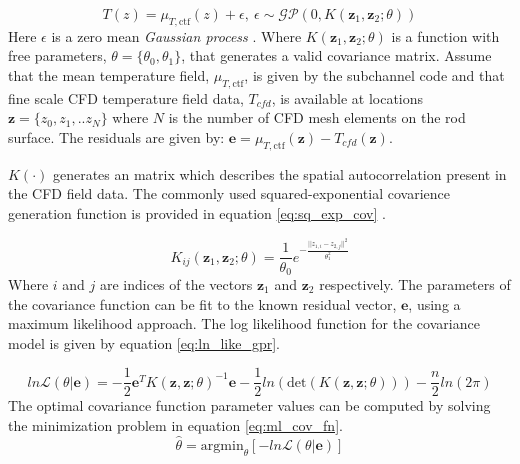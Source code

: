 \begin{equation}
T(z) = \mu_{T, \mathrm{ctf}}(z) + \epsilon,\ \epsilon \sim \mathcal {GP}(0, K(\mathbf z_1, \mathbf z_2;\theta))
\label{eq:simple_krig_ab}
\end{equation}
Here $\epsilon$ is a zero mean \emph{Gaussian process}  \cite{rasmussen2004gaussian}.
Where $K(\mathbf z_1, \mathbf z_2;\theta)$ is a function  with free parameters, $\theta=\{\theta_0,\theta_1\}$, that generates a valid covariance matrix.  Assume that the mean temperature field, $\mu_{T, \mathrm{ctf}}$, is given by the subchannel code and that fine scale CFD temperature field data, $T_{cfd}$, is available at locations $\mathbf z = \{z_0, z_1, .. z_N\}$ where $N$ is the number of CFD mesh elements on the rod surface.  The residuals are given by: $\mathbf e = \mu_{T, \mathrm{ctf}}(\mathbf z) - T_{cfd}(\mathbf z)$.  

$K(\cdot)$ generates an matrix which describes the spatial autocorrelation present in the CFD field data.  The commonly used squared-exponential covarience generation function is provided in equation \ref{eq:sq_exp_cov} \cite{rasmussen2004gaussian}.

\begin{equation}
K_{ij}(\mathbf z_1, \mathbf z_2;\theta) = \frac{1}{\theta_0} e^{- \frac{||z_{1,i} - z_{2,j}||^2}{\theta_1^2}}
\label{eq:sq_exp_cov}
\end{equation}
Where $i$ and $j$ are indices of the vectors $\mathbf z_1$ and $\mathbf z_2$ respectively.
The parameters of the covariance function can be fit to the known residual vector, $\mathbf e$, using a maximum likelihood approach. 
The log likelihood function for the covariance model is given by equation \ref{eq:ln_like_gpr}.

%

\begin{equation}
ln \mathcal L(\theta|\mathbf e) = -\frac{1}{2} \mathbf e^T K(\mathbf z, \mathbf z; \theta)^{-1} \mathbf e - \frac{1}{2} ln (\mathrm{det}(K(\mathbf z, \mathbf z; \theta))) - \frac{n}{2}ln(2\pi)
\label{eq:ln_like_gpr}
\end{equation}
The optimal covariance function parameter values can be computed by solving the minimization problem in equation \ref{eq:ml_cov_fn}.
\begin{equation}
\hat \theta = \mathrm{argmin}_{\theta}[ -ln \mathcal L(\theta| \mathbf e)]
\label{eq:ml_cov_fn}
\end{equation}

